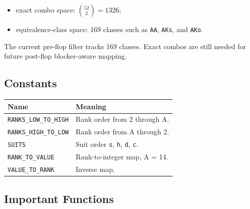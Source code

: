 \documentclass[11pt]{article}
\begin{document}
\begin{itemize}[leftmargin=*]
  \item exact combo space: \(\binom{52}{2}=1326\);
  \item equivalence-class space: 169 classes such as \texttt{AA}, \texttt{AKs},
  and \texttt{AKo}.
\end{itemize}

The current pre-flop filter tracks 169 classes. Exact combos are still needed
for future post-flop blocker-aware mapping.

\subsection{Constants}

\begin{center}
\begin{tabular}{ll}
\toprule
\textbf{Name} & \textbf{Meaning} \\
\midrule
\texttt{RANKS\_LOW\_TO\_HIGH} & Rank order from 2 through A. \\
\texttt{RANKS\_HIGH\_TO\_LOW} & Rank order from A through 2. \\
\texttt{SUITS} & Suit order \texttt{s}, \texttt{h}, \texttt{d}, \texttt{c}. \\
\texttt{RANK\_TO\_VALUE} & Rank-to-integer map, A = 14. \\
\texttt{VALUE\_TO\_RANK} & Inverse map. \\
\bottomrule
\end{tabular}
\end{center}

\subsection{Important Functions}
\end{document}
